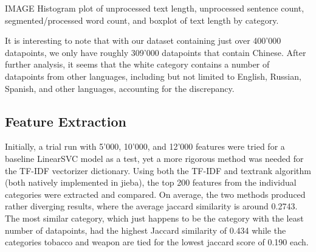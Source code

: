\documentclass[
  titlepage]{article}
\begin{document}
IMAGE Histogram plot of unprocessed text length, unprocessed sentence
count, segmented/processed word count, and boxplot of text length by
category.

It is interesting to note that with our dataset containing just over
400'000 datapoints, we only have roughly 309'000 datapoints that contain
Chinese. After further analysis, it seems that the white category
contains a number of datapoints from other languages, including but not
limited to English, Russian, Spanish, and other languages, accounting
for the discrepancy.

\subsection{Feature Extraction}\label{feature-extraction}

Initially, a trial run with 5'000, 10'000, and 12'000 features were
tried for a baseline LinearSVC model as a test, yet a more rigorous
method was needed for the TF-IDF vectorizer dictionary. Using both the
TF-IDF and textrank algorithm (both natively implemented in jieba), the
top 200 features from the individual categories were extracted and
compared. On average, the two methods produced rather diverging results,
where the average jaccard similarity is around 0.2743. The most similar
category, which just happens to be the category with the least number of
datapoints, had the highest Jaccard similarity of 0.434 while the
categories tobacco and weapon are tied for the lowest jaccard score of
0.190 each.
\end{document}

